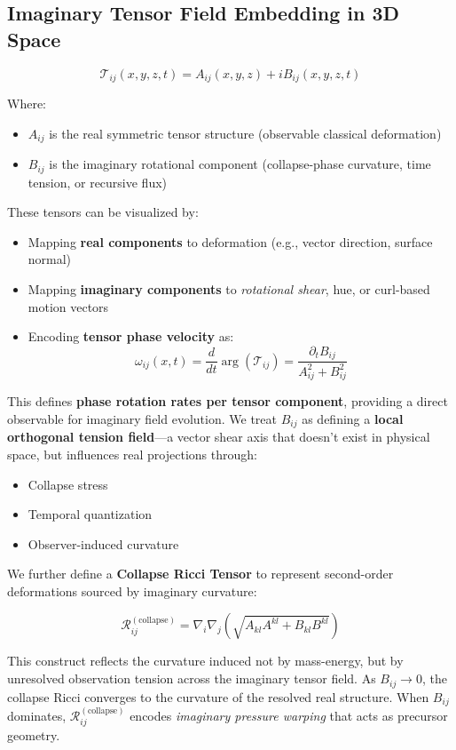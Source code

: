 \subsection{Imaginary Tensor Field Embedding in 3D Space}

\[
\mathcal{T}_{ij}(x, y, z, t) = A_{ij}(x, y, z) + iB_{ij}(x, y, z, t)
\]

Where:
\begin{itemize}
  \item $A_{ij}$ is the real symmetric tensor structure (observable classical deformation)
  \item $B_{ij}$ is the imaginary rotational component (collapse-phase curvature, time tension, or recursive flux)
\end{itemize}

These tensors can be visualized by:

\begin{itemize}
  \item Mapping \textbf{real components} to deformation (e.g., vector direction, surface normal)
  \item Mapping \textbf{imaginary components} to \textit{rotational shear}, hue, or curl-based motion vectors
  \item Encoding \textbf{tensor phase velocity} as:
\[
\omega_{ij}(x, t) = \frac{d}{dt} \arg(\mathcal{T}_{ij}) = \frac{\partial_t B_{ij}}{A_{ij}^2 + B_{ij}^2}
\]
\end{itemize}

This defines \textbf{phase rotation rates per tensor component}, providing a direct observable for imaginary field evolution. \cite{imaginary_meta} We treat $B_{ij}$ as defining a \textbf{local orthogonal tension field}---a vector shear axis that doesn’t exist in physical space, but influences real projections through:

\begin{itemize}
  \item Collapse stress
  \item Temporal quantization
  \item Observer-induced curvature
\end{itemize}

We further define a \textbf{Collapse Ricci Tensor} to represent second-order deformations sourced by imaginary curvature:

\[
\mathcal{R}^{(\text{collapse})}_{ij} = \nabla_i \nabla_j \left( \sqrt{A_{kl}A^{kl} + B_{kl}B^{kl}} \right)
\]

This construct reflects the curvature induced not by mass-energy, but by unresolved observation tension across the imaginary tensor field. \cite{imaginary_meta} As $B_{ij} \rightarrow 0$, the collapse Ricci converges to the curvature of the resolved real structure. \cite{imaginary_meta} When $B_{ij}$ dominates, $\mathcal{R}^{(\text{collapse})}_{ij}$ encodes \textit{imaginary pressure warping} that acts as precursor geometry. 

